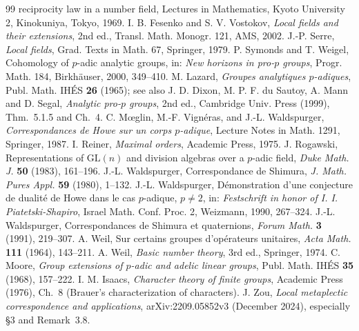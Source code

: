 \documentclass[11pt]{article}
\theoremstyle{plain}
\theoremstyle{definition}
\begin{document}
\begin{thebibliography}{99}
{reciprocity law in a number field}, Lectures in Mathematics, Kyoto
University 2, Kinokuniya, Tokyo, 1969.
 I. B. Fesenko and S. V. Vostokov, \emph{Local fields and
their extensions}, 2nd ed., Transl. Math. Monogr. 121, AMS, 2002.
 J.-P. Serre, \emph{Local fields}, Grad. Texts in Math.
67, Springer, 1979.
 P. Symonds and T. Weigel, Cohomology of $p$-adic analytic
groups, in: \emph{New horizons in pro-$p$ groups}, Progr. Math. 184,
Birkh\"auser, 2000, 349--410.
 M. Lazard, \emph{Groupes analytiques $p$-adiques},
Publ. Math. IH\'ES \textbf{26} (1965); see also J. D. Dixon, M. P. F. du
Sautoy, A. Mann and D. Segal, \emph{Analytic pro-$p$ groups}, 2nd ed.,
Cambridge Univ. Press (1999), Thm.~5.1.5 and Ch.~4.
 C. M\oe glin, M.-F. Vign\'eras, and J.-L. Waldspurger,
\emph{Correspondances de Howe sur un corps $p$-adique}, Lecture Notes
in Math. 1291, Springer, 1987.
 I. Reiner, \emph{Maximal orders}, Academic Press, 1975.
 J. Rogawski, Representations of $\mathrm{GL}(n)$ and
division algebras over a $p$-adic field, \emph{Duke Math. J.} \textbf{50}
(1983), 161--196.
 J.-L. Waldspurger, Correspondance de Shimura, \emph{J.
Math. Pures Appl.} \textbf{59} (1980), 1--132.
 J.-L. Waldspurger, D\'emonstration d'une conjecture de
dualit\'e de Howe dans le cas $p$-adique, $p\ne2$, in: \emph{Festschrift
in honor of I. I. Piatetski-Shapiro}, Israel Math. Conf. Proc. 2,
Weizmann, 1990, 267--324.
 J.-L. Waldspurger, Correspondances de Shimura et
quaternions, \emph{Forum Math.} \textbf{3} (1991), 219--307.
 A. Weil, Sur certains groupes d'op\'erateurs unitaires,
\emph{Acta Math.} \textbf{111} (1964), 143--211.
 A. Weil, \emph{Basic number theory}, 3rd ed., Springer, 1974.
 C. Moore, \emph{Group extensions of $p$-adic and adelic
linear groups}, Publ. Math. IH\'ES \textbf{35} (1968), 157--222.
 I. M. Isaacs, \emph{Character theory of finite groups},
Academic Press (1976), Ch.~8 (Brauer's characterization of characters).
 J. Zou,
\emph{Local metaplectic correspondence and applications},
arXiv:2209.05852v3 (December 2024), especially \S3 and Remark~3.8.
\end{thebibliography}
\end{document}
